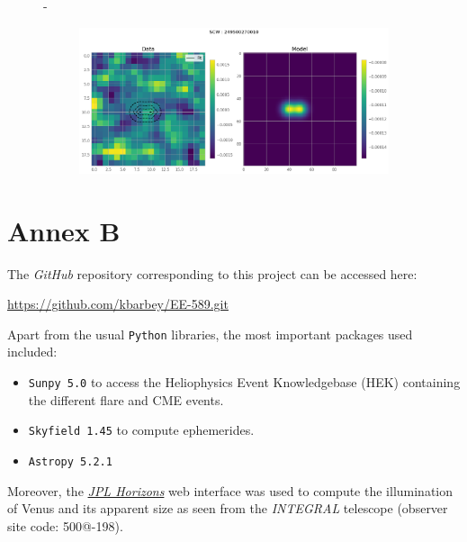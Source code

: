 \documentclass[
	a4paper, %
	10pt, %
	unnumberedsections, %
	twoside, %
]{LTJournalArticle}
\begin{document}
\begin{figure}[H]
\begin{subfigure}{.47\textwidth}
    \end{subfigure}
    \hspace{1em}-
    \begin{subfigure}{.47\textwidth}
        \includegraphics[width=\textwidth]{report/Figures/models/2404/27_psf_const.png}
    \end{subfigure}%
    \caption{}
    \label{model_notconst_24}
    \end{figure}


\section{Annex B}
The \textit{GitHub} repository corresponding to this project can be accessed here:

\url{https://github.com/kbarbey/EE-589.git}

Apart from the usual \texttt{Python} libraries, the most important packages used included:

\begin{itemize}
    \item \texttt{Sunpy 5.0} to access the Heliophysics Event Knowledgebase (HEK) containing the different flare and CME events.
    \item \texttt{Skyfield 1.45} to compute ephemerides.
    \item \texttt{Astropy 5.2.1}
\end{itemize}

Moreover, the \href{https://ssd.jpl.nasa.gov/horizons/app.html}{\textit{JPL Horizons}} web interface was used to compute the illumination of Venus and its apparent size as seen from the \textit{INTEGRAL} telescope (observer site code: 500@-198).

\nocite{*}
\printbibliography %

\end{document}
